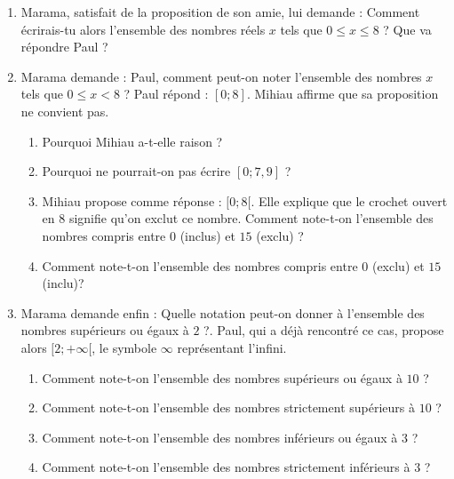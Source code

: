 \documentclass[a4paper,dvipsnames]{article}
\begin{document}
\begin{enumerate}
  \item Marama, satisfait de la proposition de son amie, lui demande : \og{}Comment écrirais-tu alors l'ensemble des nombres réels $x$ tels que $0\leq x\leq 8$ ?\fg{} Que va répondre Paul ?
  \item Marama demande : \og{}Paul, comment peut-on noter l'ensemble des nombres $x$ tels que $0\leq x<8$ ? Paul répond : $[0;8]$. Mihiau affirme que sa proposition ne convient pas.
    \begin{enumerate}
      \item Pourquoi Mihiau a-t-elle raison ?
      \item Pourquoi ne pourrait-on pas écrire $[0;7,9]$ ?
      \item Mihiau propose comme réponse : $[0;8[$. Elle explique que le \og{}crochet ouvert\fg{} en $8$ signifie qu'on exclut ce nombre. Comment note-t-on l'ensemble des nombres compris entre $0$ (inclus) et $15$ (exclu) ?
      \item Comment note-t-on l'ensemble des nombres compris entre $0$ (exclu) et $15$ (inclu)?
    \end{enumerate}
  \item Marama demande enfin : \og{}Quelle notation peut-on donner à l'ensemble des nombres supérieurs ou égaux à $2$ ?\fg{}. Paul, qui a déjà rencontré ce cas, propose alors $[2;+\infty[$, le symbole $\infty$ représentant \og{}l'infini\fg{}.
    \begin{enumerate}
      \item Comment note-t-on l'ensemble des nombres supérieurs ou égaux à $10$ ?
      \item Comment note-t-on l'ensemble des nombres strictement supérieurs à $10$ ?
      \item Comment note-t-on l'ensemble des nombres inférieurs ou égaux à $3$ ?
      \item Comment note-t-on l'ensemble des nombres strictement inférieurs à $3$ ?
    \end{enumerate}
\end{enumerate}
\end{document}
